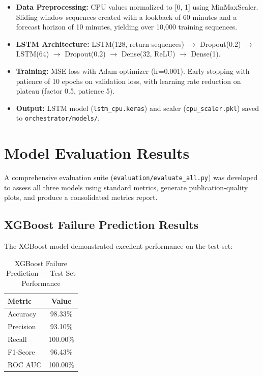 \documentclass[12pt]{report}
\begin{document}
\begin{itemize}
    \item \textbf{Data Preprocessing:} CPU values normalized to [0, 1] using MinMaxScaler. Sliding window sequences created with a lookback of 60 minutes and a forecast horizon of 10 minutes, yielding over 10,000 training sequences.
    \item \textbf{LSTM Architecture:} LSTM(128, return sequences) $\rightarrow$ Dropout(0.2) $\rightarrow$ LSTM(64) $\rightarrow$ Dropout(0.2) $\rightarrow$ Dense(32, ReLU) $\rightarrow$ Dense(1).
    \item \textbf{Training:} MSE loss with Adam optimizer (lr=0.001). Early stopping with patience of 10 epochs on validation loss, with learning rate reduction on plateau (factor 0.5, patience 5).
    \item \textbf{Output:} LSTM model (\texttt{lstm\_cpu.keras}) and scaler (\texttt{cpu\_scaler.pkl}) saved to \texttt{orchestrator/models/}.
\end{itemize}

\section{Model Evaluation Results}

A comprehensive evaluation suite (\texttt{evaluation/evaluate\_all.py}) was developed to assess all three models using standard metrics, generate publication-quality plots, and produce a consolidated metrics report.

\subsection{XGBoost Failure Prediction Results}

The XGBoost model demonstrated excellent performance on the test set:

\begin{table}[h!]
\centering
\caption{XGBoost Failure Prediction --- Test Set Performance}
\label{table:xgboost_results}
\begin{tabular}{|l|c|}
\hline
\textbf{Metric} & \textbf{Value} \\
\hline
Accuracy & 98.33\% \\
Precision & 93.10\% \\
Recall & 100.00\% \\
F1-Score & 96.43\% \\
ROC AUC & 100.00\% \\
\hline
\end{tabular}
\end{table}
\end{document}
